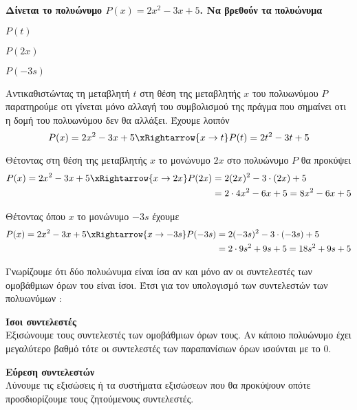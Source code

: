 \textbf{Δίνεται το πολυώνυμο {\boldmath$ P(x)=2x^2-3x+5 $}. Να βρεθούν τα πολυώνυμα}
{\boldmath
\begin{multicols}{3}
\begin{brlist}
\item $ P(t) $
\item $ P(2x) $
\item $ P(-3s) $
\end{brlist}\end{multicols}}
\lysh
\begin{rlist}
\item Αντικαθιστώντας τη μεταβλητή $ t $ στη θέση της μεταβλητής $ x $ του πολυωνύμου $ P $ παρατηρούμε οτι γίνεται μόνο αλλαγή του συμβολισμού της πράγμα που σημαίνει οτι η δομή του πολυωνύμου δεν θα αλλάξει. Έχουμε λοιπόν
\[ P(x)=2x^2-3x+5\xRightarrow{x\rightarrow t}P(t)=2t^2-3t+5 \]
\item Θέτοντας στη θέση της μεταβλητής $ x $ το μονώνυμο $ 2x $ στο πολυώνυμο $ P $ θα προκύψει
\begin{align*}
 P(x)=2x^2-3x+5\xRightarrow{x\rightarrow 2x}P(2x)&=2(2x)^2-3\cdot(2x)+5\\
&=2\cdot 4x^2-6x+5=8x^2-6x+5
\end{align*}
\item Θέτοντας όπου $ x $ το μονώνυμο $ -3s $ έχουμε
\begin{align*}
 P(x)=2x^2-3x+5\xRightarrow{x\rightarrow -3s}P(-3s)&=2(-3s)^2-3\cdot(-3s)+5\\
&=2\cdot 9s^2+9s+5=18s^2+9s+5
\end{align*}
\end{rlist}
\begin{Methodos}{4cm}
Γνωρίζουμε ότι δύο πολυώνυμα είναι ίσα αν και μόνο αν οι συντελεστές των ομοβάθμιων όρων του είναι ίσοι. Έτσι για τον υπολογισμό των συντελεστών των πολυωνύμων :
\begin{bhma}
\item \textbf{Ίσοι συντελεστές}\\
Εξισώνουμε τους συντελεστές των ομοβάθμιων όρων τους. Αν κάποιο πολυώνυμο έχει μεγαλύτερο βαθμό τότε οι συντελεστές των παραπανίσιων όρων ισούνται με το $ 0 $.
\item \textbf{Εύρεση συντελεστών}\\
Λύνουμε τις εξισώσεις ή τα συστήματα εξισώσεων που θα προκύψουν οπότε προσδιορίζουμε τους ζητούμενους συντελεστές.
\end{bhma}
\end{Methodos}
